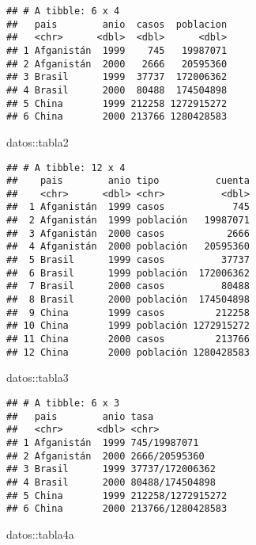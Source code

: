 \documentclass[
]{article}
\newenvironment{Shaded}{\begin{snugshade}}{\end{snugshade}}
\newcommand{\NormalTok}[1]{#1}
\newcommand{\SpecialCharTok}[1]{\textcolor[rgb]{0.00,0.00,0.00}{#1}}
\begin{document}
\begin{verbatim}
## # A tibble: 6 x 4
##   pais        anio  casos  poblacion
##   <chr>      <dbl>  <dbl>      <dbl>
## 1 Afganistán  1999    745   19987071
## 2 Afganistán  2000   2666   20595360
## 3 Brasil      1999  37737  172006362
## 4 Brasil      2000  80488  174504898
## 5 China       1999 212258 1272915272
## 6 China       2000 213766 1280428583
\end{verbatim}

\begin{Shaded}
\begin{Highlighting}[]
\NormalTok{datos}\SpecialCharTok{::}\NormalTok{tabla2}
\end{Highlighting}
\end{Shaded}

\begin{verbatim}
## # A tibble: 12 x 4
##    pais        anio tipo          cuenta
##    <chr>      <dbl> <chr>          <dbl>
##  1 Afganistán  1999 casos            745
##  2 Afganistán  1999 población   19987071
##  3 Afganistán  2000 casos           2666
##  4 Afganistán  2000 población   20595360
##  5 Brasil      1999 casos          37737
##  6 Brasil      1999 población  172006362
##  7 Brasil      2000 casos          80488
##  8 Brasil      2000 población  174504898
##  9 China       1999 casos         212258
## 10 China       1999 población 1272915272
## 11 China       2000 casos         213766
## 12 China       2000 población 1280428583
\end{verbatim}

\begin{Shaded}
\begin{Highlighting}[]
\NormalTok{datos}\SpecialCharTok{::}\NormalTok{tabla3}
\end{Highlighting}
\end{Shaded}

\begin{verbatim}
## # A tibble: 6 x 3
##   pais        anio tasa             
##   <chr>      <dbl> <chr>            
## 1 Afganistán  1999 745/19987071     
## 2 Afganistán  2000 2666/20595360    
## 3 Brasil      1999 37737/172006362  
## 4 Brasil      2000 80488/174504898  
## 5 China       1999 212258/1272915272
## 6 China       2000 213766/1280428583
\end{verbatim}

\begin{Shaded}
\begin{Highlighting}[]
\NormalTok{datos}\SpecialCharTok{::}\NormalTok{tabla4a}
\end{Highlighting}
\end{Shaded}
\end{document}
